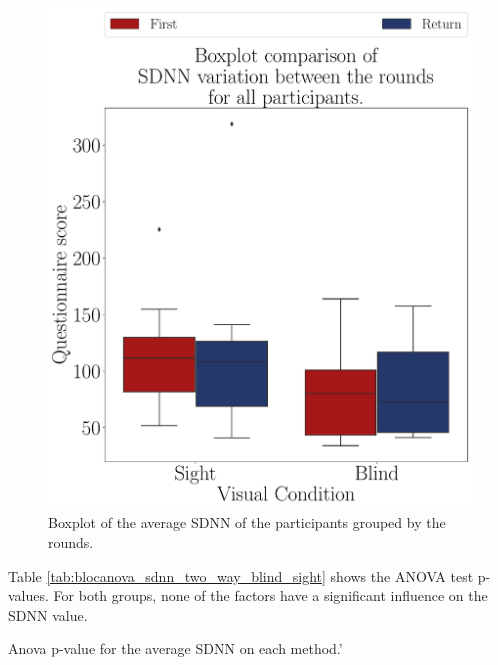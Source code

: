 \begin{figure}[!htb]
    \centering
    \includegraphics[width = 0.75\linewidth]{Resultados/ECG/Figuras/pdf/boxplot_ecg_sdnn_4_rounds.pdf}
    \caption{Boxplot of the average SDNN of the participants grouped by the rounds.}
    \label{fig:boxplot_ecg_sdnn_4_rounds}
\end{figure}
 
%
%

Table \ref{tab:blocanova_sdnn_two_way_blind_sight} shows the ANOVA test p-values. For both groups, none of the factors have a significant influence on the SDNN value.

\begin{table}[!htb]
    \caption{Anova p-value for the average SDNN on each method.'}
    \label{tab:blocanova_sdnn_two_way_blind_sight}
\begin{minipage}{0.45\linewidth}
    
\end{minipage}%
\begin{minipage}{0.05\linewidth}
    \hfill
\end{minipage}%
\begin{minipage}{0.45\linewidth}
    
\end{minipage}
\end{table}

